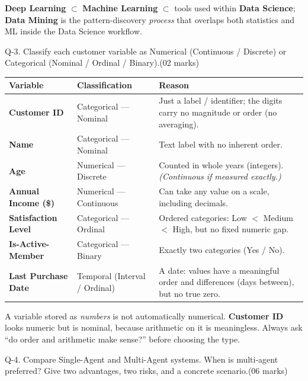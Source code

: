 \documentclass[11pt,a4paper]{article}
\newcommand{\question}[3][05 marks]{%
  \begin{qbox}#2\hfill\textcolor{accent}{(#1)}\\[2pt]#3\end{qbox}%
}
\begin{document}
\begin{conceptbox}
\textbf{Deep Learning} $\subset$ \textbf{Machine Learning} $\subset$ tools used within \textbf{Data Science}; \textbf{Data Mining} is the pattern-discovery \emph{process} that overlaps both statistics and ML inside the Data Science workflow.
\end{conceptbox}

\question[02 marks]{Q-3. Classify each customer variable as Numerical (Continuous / Discrete) or Categorical (Nominal / Ordinal / Binary).}{}

\begin{center}
\begin{tabular}{@{}>{\bfseries}p{3.6cm}p{3.4cm}p{6.0cm}@{}}
\toprule
\rowcolor{primary!15}
\textbf{Variable} & \textbf{Classification} & \textbf{Reason} \\
\midrule
Customer ID & Categorical --- Nominal & Just a label / identifier; the digits carry no magnitude or order (no averaging). \\
Name & Categorical --- Nominal & Text label with no inherent order. \\
Age & Numerical --- Discrete & Counted in whole years (integers). \emph{(Continuous if measured exactly.)} \\
Annual Income (\$) & Numerical --- Continuous & Can take any value on a scale, including decimals. \\
Satisfaction Level & Categorical --- Ordinal & Ordered categories: Low $<$ Medium $<$ High, but no fixed numeric gap. \\
Is-Active-Member & Categorical --- Binary & Exactly two categories (Yes / No). \\
Last Purchase Date & Temporal (Interval / Ordinal) & A date: values have a meaningful order and differences (days between), but no true zero. \\
\bottomrule
\end{tabular}
\end{center}

\begin{conceptbox}
A variable stored as \emph{numbers} is not automatically numerical. \textbf{Customer ID} looks numeric but is nominal, because arithmetic on it is meaningless. Always ask ``do order and arithmetic make sense?'' before choosing the type.
\end{conceptbox}

\question[06 marks]{Q-4. Compare Single-Agent and Multi-Agent systems. When is multi-agent preferred? Give two advantages, two risks, and a concrete scenario.}{}
\end{document}
